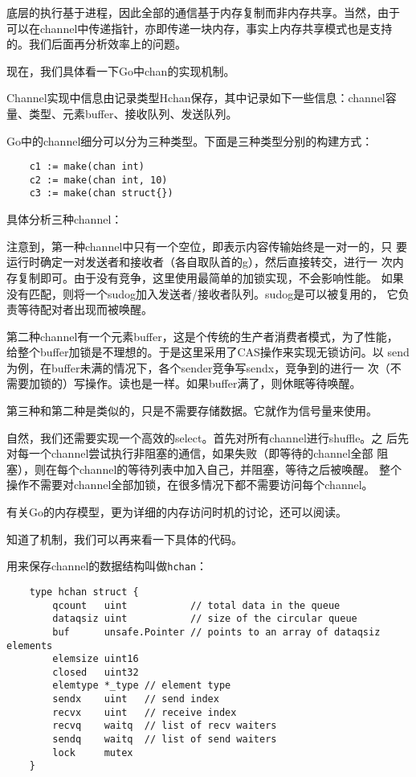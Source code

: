 \documentclass[UTF8,b5paper,fontset=adobe]{ctexart}
\begin{document}
底层的执行基于进程，因此全部的通信基于内存复制而非内存共享。当然，由于
可以在channel中传递指针，亦即传递一块内存，事实上内存共享模式也是支持
的。我们后面再分析效率上的问题。

现在，我们具体看一下Go中chan的实现机制\cite{vyukov2014}。

Channel实现中信息由记录类型Hchan保存，其中记录如下一些信息：channel容
量、类型、元素buffer、接收队列、发送队列。

Go中的channel细分可以分为三种类型。下面是三种类型分别的构建方式：

\begin{verbatim}
    c1 := make(chan int)
    c2 := make(chan int, 10)
    c3 := make(chan struct{})
\end{verbatim}

具体分析三种channel：

注意到，第一种channel中只有一个空位，即表示内容传输始终是一对一的，只
要运行时确定一对发送者和接收者（各自取队首的g），然后直接转交，进行一
次内存复制即可。由于没有竞争，这里使用最简单的加锁实现，不会影响性能。
如果没有匹配，则将一个sudog加入发送者/接收者队列。sudog是可以被复用的，
它负责等待配对者出现而被唤醒。

第二种channel有一个元素buffer，这是个传统的生产者消费者模式，为了性能，
给整个buffer加锁是不理想的。于是这里采用了CAS操作来实现无锁访问。以
send为例，在buffer未满的情况下，各个sender竞争写sendx，竞争到的进行一
次（不需要加锁的）写操作。读也是一样。如果buffer满了，则休眠等待唤醒。

第三种和第二种是类似的，只是不需要存储数据。它就作为信号量来使用。

自然，我们还需要实现一个高效的select。首先对所有channel进行shuffle。之
后先对每一个channel尝试执行非阻塞的通信，如果失败（即等待的channel全部
阻塞），则在每个channel的等待列表中加入自己，并阻塞，等待之后被唤醒。
整个操作不需要对channel全部加锁，在很多情况下都不需要访问每个channel。

有关Go的内存模型，更为详细的内存访问时机的讨论，还可以阅读\cite{mem}。

知道了机制，我们可以再来看一下具体的代码。

用来保存channel的数据结构叫做\verb+hchan+：

\begin{verbatim}
    type hchan struct {
        qcount   uint           // total data in the queue
        dataqsiz uint           // size of the circular queue
        buf      unsafe.Pointer // points to an array of dataqsiz elements
        elemsize uint16
        closed   uint32
        elemtype *_type // element type
        sendx    uint   // send index
        recvx    uint   // receive index
        recvq    waitq  // list of recv waiters
        sendq    waitq  // list of send waiters
        lock     mutex
    }
\end{verbatim}
\end{document}
